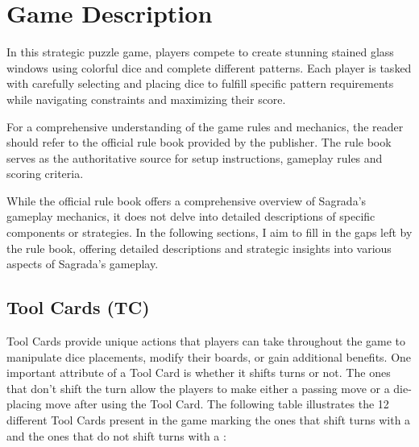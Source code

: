 \chapter{Game Description}

In this strategic puzzle game, players compete to create stunning stained glass windows using colorful 
dice and complete different patterns. Each player is tasked with carefully selecting and placing dice to fulfill 
specific pattern requirements while navigating constraints and maximizing their score.

For a comprehensive understanding of the game rules and mechanics, the reader should refer to 
the official rule book provided by the publisher. The rule book  \textcite{Sagradarulesbook} serves as the 
authoritative source for setup instructions, gameplay rules and scoring criteria.

While the official rule book offers a comprehensive overview of Sagrada's gameplay mechanics, it does not 
delve into detailed descriptions of specific components or strategies. In the following sections, I aim 
to fill in the gaps left by the rule book, offering detailed descriptions and strategic insights into 
various aspects of Sagrada's gameplay.



\newcommand{\cmark}{\ding{51}}%
\newcommand{\xmark}{\ding{55}}%

\section{Tool Cards (TC)}
Tool Cards provide unique actions that players can take throughout the game to manipulate dice placements, 
modify their boards, or gain additional benefits. One important attribute of a Tool Card is whether it shifts turns or not.
The ones that don't shift the turn allow the players to make either a passing move or a die-placing move after using the Tool Card.
The following table illustrates the 12 different Tool Cards present in the game marking the ones that shift turns with a \cmark and
the ones that do not shift turns with a \xmark :


\setlength{\extrarowheight}{13pt}

